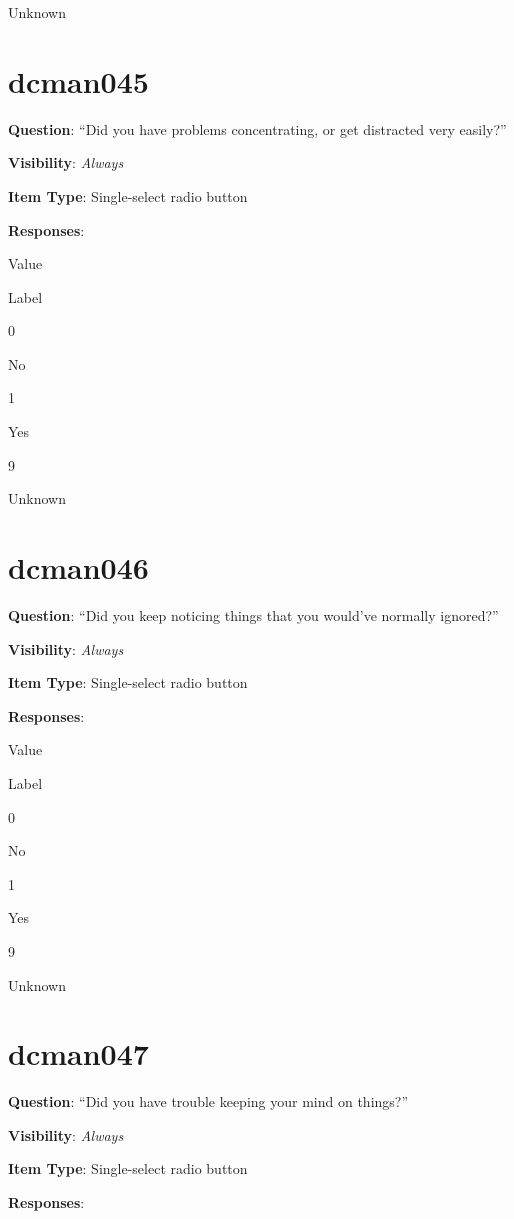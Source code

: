 \documentclass[]{book}
\begin{document}
Unknown

\hypertarget{dcman045}{%
\section{dcman045}\label{dcman045}}

\textbf{Question}: ``Did you have problems concentrating, or get distracted very easily?''

\textbf{Visibility}: \emph{Always}

\textbf{Item Type}: Single-select radio button

\textbf{Responses}:

Value

Label

0

No

1

Yes

9

Unknown

\hypertarget{dcman046}{%
\section{dcman046}\label{dcman046}}

\textbf{Question}: ``Did you keep noticing things that you would've normally ignored?''

\textbf{Visibility}: \emph{Always}

\textbf{Item Type}: Single-select radio button

\textbf{Responses}:

Value

Label

0

No

1

Yes

9

Unknown

\hypertarget{dcman047}{%
\section{dcman047}\label{dcman047}}

\textbf{Question}: ``Did you have trouble keeping your mind on things?''

\textbf{Visibility}: \emph{Always}

\textbf{Item Type}: Single-select radio button

\textbf{Responses}:
\end{document}
